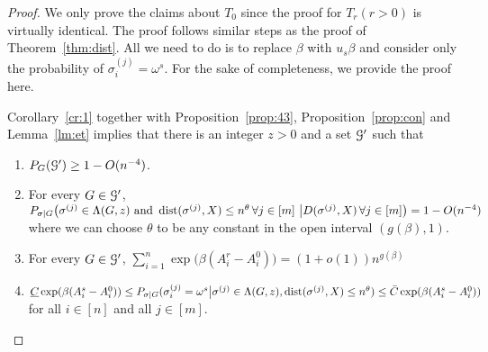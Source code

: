 \documentclass{article}
\begin{document}
\begin{proof}

	We only prove the claims about $T_0$ since the proof for $T_r (r>0)$ is virtually identical.
	The proof follows similar steps as the proof of Theorem~\ref{thm:dist}. All we need to do is to replace $\beta$ with $u_s\beta$ and consider
	only the probability of $\sigma^{(j)}_i = \omega^s$. For the sake of completeness, we provide the proof here.
	
	Corollary~\ref{cr:1} together with Proposition~\ref{prop:43}, Proposition~\ref{prop:con} and Lemma~\ref{lm:et} implies that there is an integer $z>0$ and a set $\mathcal{G}'$ such that
	\begin{enumerate}[label=(\roman*)]
		\item 	$P_G(\mathcal{G}') \ge 1- O(n^{-4})$.
		\item For every $G\in\mathcal{G}'$, 
		$P_{\sigma|G} \big( \sigma^{(j)}\in  \Lambda(G, z)
		\text{~and~} \operatorname{dist}(\sigma^{(j)}, X) \le n^\theta
		\,\forall j\in[m] ~\big| D(\sigma^{(j)}, X)
		\,\forall j\in[m]  \big)
		=1- O(n^{-4})
		$ where we can choose $\theta$ to be any constant in the open interval $(g(\beta), 1)$.
		\item For every $G\in\mathcal{G}'$, $\sum_{i=1}^n \exp\big(\beta (A^r_i-A^0_i) \big)
		=(1+o(1)) n^{g(\beta)}$	
		\item $\underline{C} \exp(\beta (A^s_i-A^0_i)) \leq P_{\sigma|G}(\sigma_i^{(j)} = \omega^s \big| \sigma^{(j)}\in \Lambda(G,z) ,\operatorname{dist}(\sigma^{(j)}, X) \le n^{\theta} )
		\leq \bar{C} \exp(\beta (A^s_i-A^0_i))$ for all $i\in[n]$ and all $j\in[m]$.
	\end{enumerate}


\end{proof}
\end{document}
